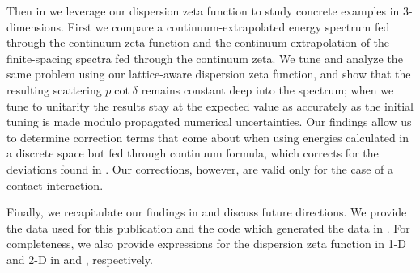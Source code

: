 Then in  we leverage our dispersion zeta function to study concrete examples in 3-dimensions.
First we compare a continuum-extrapolated energy spectrum fed through the continuum zeta function and the continuum extrapolation of the finite-spacing spectra fed through the continuum zeta.
We tune and analyze the same problem using our lattice-aware dispersion zeta function, and show that the resulting scattering $p\cot\delta$ remains constant deep into the spectrum; when we tune to unitarity the results stay at the expected value as accurately as the initial tuning is made modulo propagated numerical uncertainties.  Our findings allow us to determine correction terms that come about when using energies calculated in a discrete space but fed through continuum \Luscher formula, which %
corrects for the deviations found in .  Our corrections, however, are valid only for the case of a contact interaction.

Finally, we recapitulate our findings in  and discuss future directions.
We provide the data used for this publication and the code which generated the data in .  For completeness, we also provide expressions for the dispersion zeta function in 1-D and 2-D in  and , respectively.
